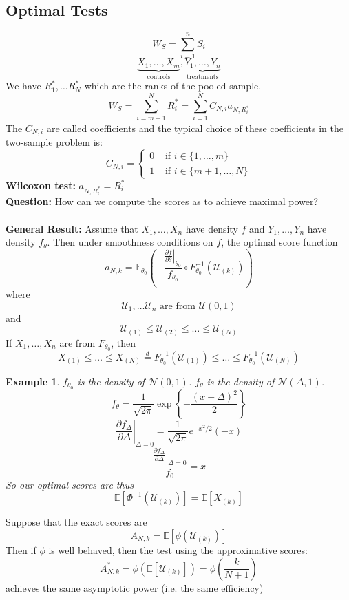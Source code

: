 \documentclass[a4paper,12pt]{amsart}
\newcommand{\sumin}{\sum_{i=1}^n}
\newcommand{\E}[1]{\mathbb{E}\left[#1\right]}
\newtheorem{ex}{Example}
\begin{document}
\subsection{Optimal Tests}
\[W_S = \sumin S_i\]
\[\underbrace{X_1, \ldots, X_m}_{\text{controls}}, \underbrace{Y_1, \ldots, Y_n}_{\text{treatments}}\]
We have $R_1^*, \ldots R_N^*$ which are the ranks of the pooled sample.
\[W_S = \sum_{i=m+1}^N R_i^* = \sum_{i=1}^N C_{N,i} a_{N,R_i^*}\]
The $C_{N,i}$ are called coefficients and the typical choice of these coefficients in the two-sample problem is:
\[C_{N,i} =\begin{cases}
0 & \mbox{ if } i \in \{1,\ldots,m\}\\
1 & \mbox{ if } i \in \{m+1,\ldots,N\}
\end{cases} \]
\textbf{Wilcoxon test: } $a_{N,R_i^*} = R_i^*$\\
\textbf{Question: } How can we compute the scores as to achieve maximal power?\\
\\
\noindent
\textbf{General Result:} Assume that $X_1, \ldots, X_n$ have density $f$ and $Y_1, \ldots, Y_n$ have density $f_\theta$. Then under smoothness conditions on $f$, the optimal score function 
\[a_{N,k} = \mathbb{E}_{\theta_0}\left(-\frac{\left.\frac{\partial f}{\partial \theta}\right|_{\theta_0}}{f_{\theta_0}} \circ F_{\theta_0}^{-1}(\mathcal{U}_{(k)})\right)\]
where
\[\mathcal{U}_1, \ldots \mathcal{U}_n \mbox{ are from } \mathcal{U}(0,1)\]
and
\[\mathcal{U}_{(1)} \leq \mathcal{U}_{(2)} \leq \ldots \leq \mathcal{U}_{(N)}\]
If $X_1, \ldots, X_n$ are from $F_{\theta_0}$, then
\[X_{(1)} \leq \ldots \leq X_{(N)} \overset{d}{=} F_{\theta_0}^{-1}(\mathcal{U}_{(1)}) \leq \ldots \leq F_{\theta_0}^{-1}(\mathcal{U}_{(N)})\]


\begin{ex}
$f_{\theta_0}$ is the density of $\mathcal{N}(0,1)$. $f_\theta$ is the density of $\mathcal{N}(\Delta,1)$.
\[f_\theta = \frac{1}{\sqrt{2\pi}} \exp\left\{-\frac{(x-\Delta)^2}{2}\right\}\]
\[\left.\frac{\partial f_\Delta}{\partial \Delta}\right|_{\Delta=0} = \frac{1}{\sqrt{2 \pi}} e^{-x^2/2}(-x)\]
\[\frac{\left.\frac{\partial f_\Delta}{\partial \Delta}\right|_{\Delta=0}}{f_0} = x\]
So our optimal scores are thus
\[\E{\Phi^{-1}(\mathcal{U}_{(k)})} = \E{X_{(k)}}\]
\end{ex}
Suppose that the exact scores are
\[A_{N,k} = \E{\phi(\mathcal{U}_{(k)})}\]
Then if $\phi$ is well behaved, then the test using the approximative scores: 
\[A_{N,k}^* = \phi(\E{\mathcal{U}_{(k)}}) = \phi\left(\frac{k}{N+1}\right)\]
achieves the same asymptotic power (i.e. the same efficiency)
\end{document}
